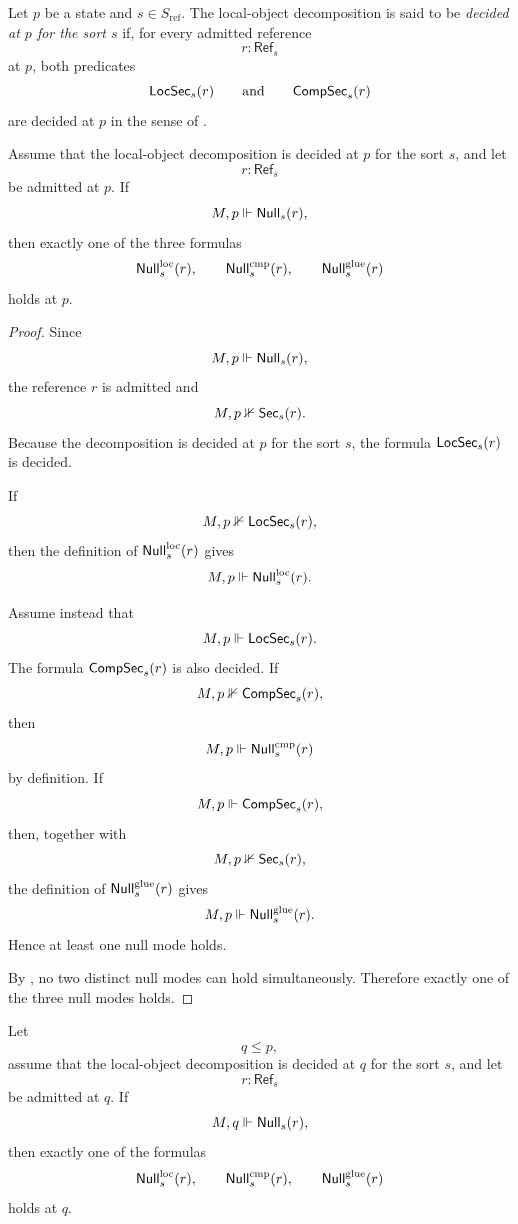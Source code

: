 \begin{definition}\label{def:decomposition-decidability}
Let $p$ be a state and $s\in S_{\mathrm{ref}}$. The local-object decomposition is said to be \emph{decided at $p$ for the sort $s$} if, for every admitted reference
\[
r:\mathsf{Ref}_s
\]
at $p$, both predicates
\[
\mathsf{LocSec}_s(r)
\qquad\text{and}\qquad
\mathsf{CompSec}_s(r)
\]
are decided at $p$ in the sense of .
\end{definition}

\begin{proposition}\label{prop:null-trichotomy}
Assume that the local-object decomposition is decided at $p$ for the sort $s$, and let
\[
r:\mathsf{Ref}_s
\]
be admitted at $p$. If
\[
M,p\Vdash \mathsf{Null}_s(r),
\]
then exactly one of the three formulas
\[
\mathsf{Null}_s^{\mathrm{loc}}(r),\qquad
\mathsf{Null}_s^{\mathrm{cmp}}(r),\qquad
\mathsf{Null}_s^{\mathrm{glue}}(r)
\]
holds at $p$.
\end{proposition}

\begin{proof}
Since
\[
M,p\Vdash \mathsf{Null}_s(r),
\]
the reference $r$ is admitted and
\[
M,p\nVdash \mathsf{Sec}_s(r).
\]
Because the decomposition is decided at $p$ for the sort $s$, the formula $\mathsf{LocSec}_s(r)$ is decided.

If
\[
M,p\nVdash \mathsf{LocSec}_s(r),
\]
then the definition of $\mathsf{Null}_s^{\mathrm{loc}}(r)$ gives
\[
M,p\Vdash \mathsf{Null}_s^{\mathrm{loc}}(r).
\]

Assume instead that
\[
M,p\Vdash \mathsf{LocSec}_s(r).
\]
The formula $\mathsf{CompSec}_s(r)$ is also decided. If
\[
M,p\nVdash \mathsf{CompSec}_s(r),
\]
then
\[
M,p\Vdash \mathsf{Null}_s^{\mathrm{cmp}}(r)
\]
by definition. If
\[
M,p\Vdash \mathsf{CompSec}_s(r),
\]
then, together with
\[
M,p\nVdash \mathsf{Sec}_s(r),
\]
the definition of $\mathsf{Null}_s^{\mathrm{glue}}(r)$ gives
\[
M,p\Vdash \mathsf{Null}_s^{\mathrm{glue}}(r).
\]
Hence at least one null mode holds.

By , no two distinct null modes can hold simultaneously. Therefore exactly one of the three null modes holds.
\end{proof}

\begin{proposition}\label{thm:null-classification-under-refinement}
Let
\[
q\le p,
\]
assume that the local-object decomposition is decided at $q$ for the sort $s$, and let
\[
r:\mathsf{Ref}_s
\]
be admitted at $q$. If
\[
M,q\Vdash \mathsf{Null}_s(r),
\]
then exactly one of the formulas
\[
\mathsf{Null}_s^{\mathrm{loc}}(r),\qquad
\mathsf{Null}_s^{\mathrm{cmp}}(r),\qquad
\mathsf{Null}_s^{\mathrm{glue}}(r)
\]
holds at $q$.
\end{proposition}

